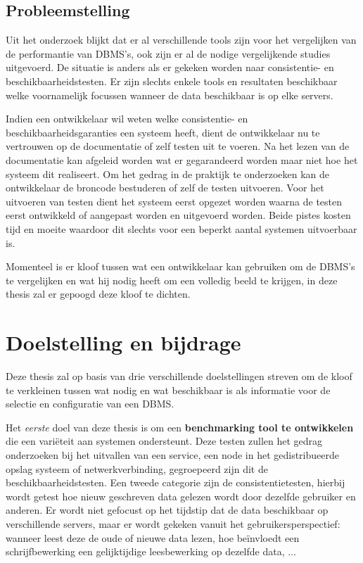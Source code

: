 \subsection{Probleemstelling}
Uit het onderzoek blijkt dat er al verschillende tools zijn voor het vergelijken van de performantie van DBMS's, ook zijn er al de nodige vergelijkende studies uitgevoerd. De situatie is anders als er gekeken worden naar consistentie- en beschikbaarheidstesten. Er zijn slechts enkele tools en resultaten beschikbaar welke voornamelijk focussen wanneer de data beschikbaar is op elke servers. 

Indien een ontwikkelaar wil weten welke consistentie- en beschikbaarheidsgaranties een systeem heeft, dient de ontwikkelaar nu te vertrouwen op de documentatie of zelf testen uit te voeren. Na het lezen van de documentatie kan afgeleid worden wat er gegarandeerd worden maar niet hoe het systeem dit realiseert. Om het gedrag in de praktijk te onderzoeken kan de ontwikkelaar de broncode bestuderen of zelf de testen uitvoeren. Voor het uitvoeren van testen dient het systeem eerst opgezet worden waarna de testen eerst ontwikkeld of aangepast worden en uitgevoerd worden. Beide pistes kosten tijd en moeite waardoor dit slechts voor een beperkt aantal systemen uitvoerbaar is. 

Momenteel is er kloof tussen wat een ontwikkelaar kan gebruiken om de DBMS's te vergelijken en wat hij nodig heeft om een volledig beeld te krijgen, in deze thesis zal er gepoogd deze kloof te dichten. 

\section{Doelstelling en bijdrage}
Deze thesis zal op basis van drie verschillende doelstellingen streven om de kloof te verkleinen tussen wat nodig en wat beschikbaar is als informatie voor de selectie en configuratie van een DBMS. 

Het \textit{eerste} doel van deze thesis is om een \textbf{benchmarking tool te ontwikkelen} die een variëteit aan systemen ondersteunt. Deze testen zullen het gedrag onderzoeken bij het uitvallen van een service, een node in het gedistribueerde opslag systeem of netwerkverbinding, gegroepeerd zijn dit de beschikbaarheidstesten. Een tweede categorie zijn de consistentietesten, hierbij wordt getest hoe nieuw geschreven data gelezen wordt door dezelfde gebruiker en anderen. Er wordt niet gefocust op het tijdstip dat de data beschikbaar op verschillende servers, maar er wordt gekeken vanuit het gebruikersperspectief: wanneer leest deze de oude of nieuwe data lezen, hoe beïnvloedt een schrijfbewerking een gelijktijdige leesbewerking op dezelfde data, ... \\

